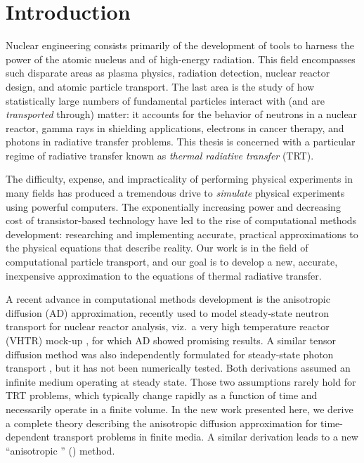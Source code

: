 
\chapter{Introduction}\label{chap:introduction}

Nuclear engineering consists primarily of the development of tools to harness
the power of the
atomic nucleus and of high-energy radiation. This field encompasses such
disparate areas as plasma physics, radiation detection, nuclear reactor design,
and atomic particle transport. The last area is the study of how
statistically large numbers of fundamental particles interact with (and are
\emph{transported} through) matter: it
accounts for the behavior of neutrons in a nuclear reactor,
gamma rays in shielding applications, electrons in cancer therapy, and photons
in radiative transfer problems. This thesis is concerned with a
particular regime of radiative transfer known as \emph{thermal radiative
transfer} (TRT).

The difficulty, expense, and impracticality of performing physical
experiments in many fields has produced a tremendous drive to
\emph{simulate} physical experiments using powerful computers. The exponentially
increasing power and decreasing cost of transistor-based technology have led to
the rise of computational methods development:
researching and implementing accurate, practical approximations to the physical
equations that describe reality. Our work is in the field of computational
particle transport, and our goal is to develop a new, accurate, inexpensive
approximation to the equations of thermal radiative transfer.

A recent advance in computational methods development is the anisotropic
diffusion (AD)
approximation, recently used to model steady-state neutron transport for
nuclear reactor analysis, viz.~a very high temperature reactor
(VHTR) mock-up \cite{Lar2009c,Tra2011}, for which AD showed promising
results. A similar tensor diffusion
method was also independently formulated for steady-state photon transport
\cite{Mor2007}, but it has not been numerically tested.
Both derivations assumed an infinite medium operating at steady state.
Those two assumptions rarely hold for TRT problems, which typically change
rapidly as a
function of time and necessarily operate in a finite volume. In the new
work presented here, we derive a complete theory describing the anisotropic
diffusion approximation for time-dependent transport problems in finite media.
A similar derivation leads to a new ``anisotropic \Pone'' (\APone) method.

